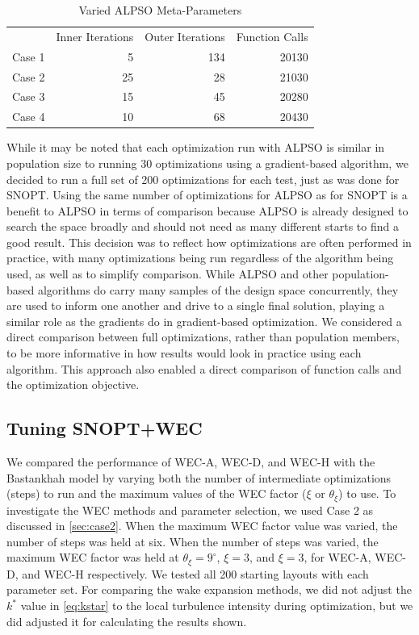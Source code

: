 \documentclass{jpconf}
\begin{document}
\begin{table}[h!]
	\centering
	\caption{Varied ALPSO Meta-Parameters}
	\label{tab:alpsoparams}
	\begin{tabular}{lrrr}
		\toprule
		{} & Inner Iterations & Outer Iterations & Function Calls\\
		\cmidrule(lr){2-4}
		Case 1 &  5  & 134 & 20130 \\
		Case 2 & 25 & 28  & 21030 \\
		Case 3 & 15 & 45 & 20280 \\
		Case 4 & 10 & 68 & 20430 \\
		\bottomrule
	\end{tabular}
\end{table}

While it may be noted that each optimization run with ALPSO is similar in population size to running 30 optimizations using a gradient-based algorithm, we decided to run a full set of 200 optimizations for each test, just as was done for SNOPT. Using the same number of optimizations for ALPSO as for SNOPT is a benefit to ALPSO in terms of comparison because ALPSO is already designed to search the space broadly and should not need as many different starts to find a good result. This decision was to reflect how optimizations are often performed in practice, with many optimizations being run regardless of the algorithm being used, as well as to simplify comparison. While ALPSO and other population-based algorithms do carry many samples of the design space concurrently, they are used to inform one another and drive to a single final solution, playing a similar role as the gradients do in gradient-based optimization. We considered a direct comparison between full optimizations, rather than population members, to be more informative in how results would look in practice using each algorithm. This approach also enabled a direct comparison of function calls and the optimization objective.

\subsection{Tuning SNOPT+WEC}\label{sec:bpa_wec_comparison}

We compared the performance of WEC-A, WEC-D, and WEC-H with the Bastankhah  model by varying both the number of intermediate optimizations (steps) to run and the maximum values of the WEC factor ($\xi$ or $\theta_\xi$) to use. To investigate the WEC methods and parameter selection, we used Case 2 as discussed in \cref{sec:case2}. When the maximum WEC factor value was varied, the number of steps was held at six. When the number of steps was varied, the maximum WEC factor was held at $\theta_\xi = 9 ^\circ$, $\xi=3$, and $\xi=3$, for WEC-A, WEC-D, and WEC-H respectively. We tested all 200 starting layouts with each parameter set. For comparing the wake expansion methods, we did not adjust the $k^*$ value in \cref{eq:kstar} to the local turbulence intensity during optimization, but we did  adjusted it for calculating the results shown.
\end{document}
